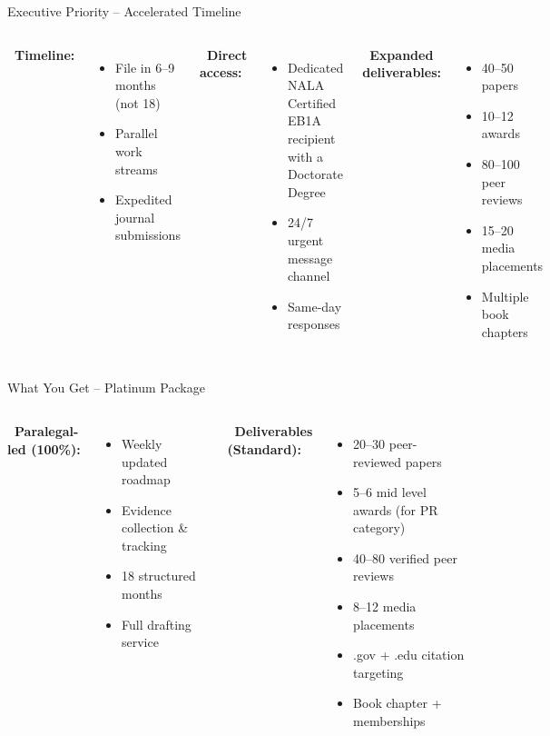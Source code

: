 \documentclass[aspectratio=169, 10pt]{beamer}
\begin{document}
	\begin{frame}{Executive Priority – Accelerated Timeline}
		\begin{columns}[T]
			\textbf{\faRocket \ Timeline:}
			\begin{itemize}
				\item File in 6–9 months (not 18)
				\item Parallel work streams
				\item Expedited journal submissions
			\end{itemize}
			
			\textbf{\faHeadset \ Direct access:}
			\begin{itemize}
				\item Dedicated NALA Certified EB1A recipient with a Doctorate Degree
				\item 24/7 urgent message channel
				\item Same-day responses
			\end{itemize}
			
			\textbf{\faTrophy \ Expanded deliverables:}
			\begin{itemize}
				\item 40–50 papers
				\item 10–12 awards
				\item 80–100 peer reviews
				\item 15–20 media placements
				\item Multiple book chapters
			\end{itemize}
		\end{columns}
	\end{frame}
	
	\begin{frame}{What You Get – Platinum Package}
		\begin{columns}[T]
			\textbf{\faUserGraduate \ Paralegal-led (100\%):}
			\begin{itemize}
				\item Weekly updated roadmap
				\item Evidence collection \& tracking
				\item 18 structured months
				\item Full drafting service
			\end{itemize}
			\textbf{\faGem \ Deliverables (Standard):}
			\begin{itemize}
				\item 20–30 peer-reviewed papers
				\item 5–6 mid level awards (for PR category)
				\item 40–80 verified peer reviews
				\item 8–12 media placements
				\item .gov + .edu citation targeting
				\item Book chapter + memberships
			\end{itemize}
		\end{columns}
	\end{frame}
	
\end{document}

